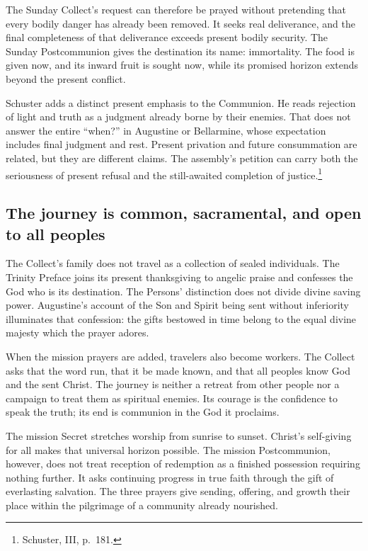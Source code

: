 The Sunday Collect's request can therefore be prayed without
pretending that every bodily danger has already been removed.
It seeks real deliverance, and the final completeness of that
deliverance exceeds present bodily security. The Sunday
Postcommunion gives the destination its name: immortality.
The food is given now, and its inward fruit is sought now,
while its promised horizon extends beyond the present conflict.

Schuster adds a distinct present emphasis to the Communion.
He reads rejection of light and truth as a judgment already
borne by their enemies. That does not answer the entire
``when?'' in Augustine or Bellarmine, whose expectation includes
final judgment and rest. Present privation and future
consummation are related, but they are different claims.
The assembly's petition can carry both the seriousness of
present refusal and the still-awaited completion of justice.\footnote{Schuster,  III, p.~181.}

\subsection{The journey is common, sacramental, and open to all peoples}
The Collect's family does not travel as a collection of sealed
individuals. The Trinity Preface joins its present thanksgiving
to angelic praise and confesses the God who is its destination.
The Persons' distinction does not divide divine saving power.
Augustine's account of the Son and Spirit being sent without
inferiority illuminates that confession: the gifts bestowed in
time belong to the equal divine majesty which the prayer adores.

When the mission prayers are added, travelers also become
workers. The Collect asks that the word run, that it be made
known, and that all peoples know God and the sent Christ.
The journey is neither a retreat from other people nor a
campaign to treat them as spiritual enemies. Its courage is
the confidence to speak the truth; its end is communion in
the God it proclaims.

The mission Secret stretches worship from sunrise to sunset.
Christ's self-giving for all makes that universal horizon
possible. The mission Postcommunion, however, does not treat
reception of redemption as a finished possession requiring
nothing further. It asks continuing progress in true faith
through the gift of everlasting salvation. The three prayers
give sending, offering, and growth their place within the
pilgrimage of a community already nourished.


